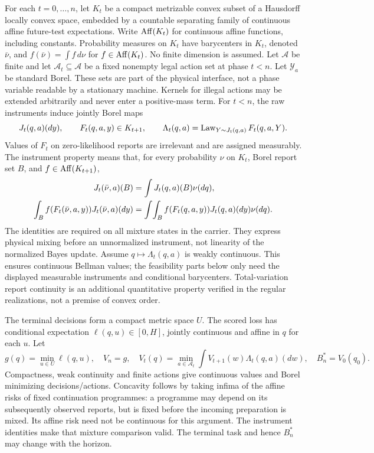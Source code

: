 For each $t=0,\ldots,n$, let $K_t$ be a compact metrizable convex subset of a Hausdorff locally convex space, embedded by a countable separating family of continuous affine future-test expectations. Write $\operatorname{Aff}(K_t)$ for continuous affine functions, including constants. Probability measures on $K_t$ have barycenters in $K_t$, denoted $\bar\nu$, and $f(\bar\nu)=\int f\,d\nu$ for $f\in\operatorname{Aff}(K_t)$. No finite dimension is assumed. Let $\mathcal A$ be finite and let $\mathcal A_t\subseteq\mathcal A$ be a fixed nonempty legal action set at phase $t<n$. Let $\mathcal Y_a$ be standard Borel. These sets are part of the physical interface, not a phase variable readable by a stationary machine. Kernels for illegal actions may be extended arbitrarily and never enter a positive-mass term. For $t<n$, the raw instruments induce jointly Borel maps
\begin{equation}\label{eq:instrument}
 J_t(q,a)(dy),\qquad F_t(q,a,y)\in K_{t+1},\qquad
 \Lambda_t(q,a)=\operatorname{Law}_{Y\sim J_t(q,a)}F_t(q,a,Y).
\end{equation}
Values of $F_t$ on zero-likelihood reports are irrelevant and are assigned measurably. The instrument property means that, for every probability $\nu$ on $K_t$, Borel report set $B$, and $f\in\operatorname{Aff}(K_{t+1})$,
\begin{align}\label{eq:affine_instrument}
 J_t(\bar\nu,a)(B)&=\int J_t(q,a)(B)\nu(dq),\\
 \int_B f(F_t(\bar\nu,a,y))J_t(\bar\nu,a)(dy)
 &=\int\!\int_B f(F_t(q,a,y))J_t(q,a)(dy)\nu(dq).\notag
\end{align}
The identities are required on all mixture states in the carrier. They express physical mixing before an unnormalized instrument, not linearity of the normalized Bayes update. Assume $q\mapsto\Lambda_t(q,a)$ is weakly continuous. This ensures continuous Bellman values; the feasibility parts below only need the displayed measurable instruments and conditional barycenters. Total-variation report continuity is an additional quantitative property verified in the regular realizations, not a premise of convex order.

The terminal decisions form a compact metric space $U$. The scored loss has conditional expectation $\ell(q,u)\in[0,H]$, jointly continuous and affine in $q$ for each $u$. Let
\begin{equation}\label{eq:bellman}
 g(q)=\min_{u\in U}\ell(q,u),\quad V_n=g,\quad
 V_t(q)=\min_{a\in\mathcal A_t}\int V_{t+1}(w)\Lambda_t(q,a)(dw),\quad B_n^*=V_0(q_0).
\end{equation}
Compactness, weak continuity and finite actions give continuous values and Borel minimizing decisions/actions. Concavity follows by taking infima of the affine risks of fixed continuation programmes: a programme may depend on its subsequently observed reports, but is fixed before the incoming preparation is mixed. Its affine risk need not be continuous for this argument. The instrument identities make that mixture comparison valid. The terminal task and hence $B_n^*$ may change with the horizon.

